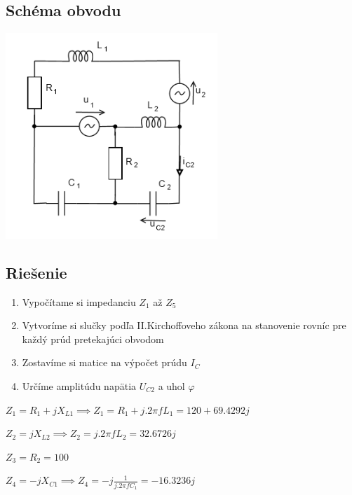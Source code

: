 \documentclass[10pt,a4paper]{article}
\begin{document}
\subsection*{Schéma obvodu}
    \begin{center}
        \includegraphics[clip, width=8cm]{4.png}
    \end{center}

 \vspace*{0.5cm}
 
 \subsection*{Riešenie}
 \begin{enumerate}
\item Vypočítame si impedanciu $Z_{1}$ až $Z_{5}$
\item Vytvoríme si slučky podľa II.Kirchoffoveho zákona na stanovenie rovníc pre každý prúd pretekajúci obvodom
\item Zostavíme si matice na výpočet prúdu $I_{C}$
\item Určíme amplitúdu napätia $U_{C2}$ a uhol $\varphi$
\end{enumerate}


\newpage
$Z_{1} = R_{1}+jX_{L1} \implies Z_{1} = R_{1}+j.2\pi fL_{1} = 120+69.4292j $ 

\vspace*{0.1cm}

$Z_{2} = jX_{L2} \implies Z_{2} = j.2\pi fL_{2} = 32.6726j $ 

\vspace*{0.1cm}

$Z_{3} = R_{2} = 100 $

\vspace*{0.1cm}

$Z_{4} = -jX_{C1} \implies Z_{4} = -j \frac{1}{j.2\pi fC_{1}} = -16.3236j $
\end{document}
